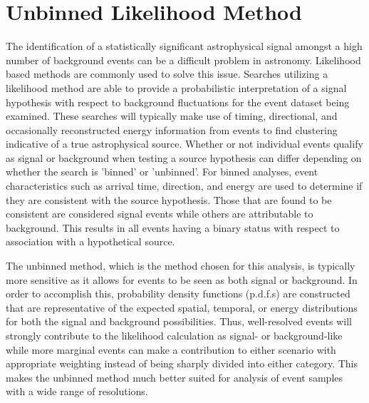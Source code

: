 \documentclass{gatech-thesis}
\begin{document}
\section{Unbinned Likelihood Method}
The identification of a statistically significant astrophysical signal amongst a high number of background events can be a difficult problem in astronomy. Likelihood based methods are commonly used to solve this issue. Searches utilizing a likelihood method are able to provide a probabilistic interpretation of a signal hypothesis with respect to background fluctuations for the event dataset being examined. These searches will typically make use of timing, directional, and occasionally reconstructed energy information from events to find clustering indicative of a true astrophysical source. Whether or not individual events qualify as signal or background when testing a source hypothesis can differ depending on whether the search is 'binned' or 'unbinned'. For binned analyses, event characteristics such as arrival time, direction, and energy are used to determine if they are consistent with the source hypothesis. Those that are found to be consistent are considered signal events while others are attributable to background. This results in all events having a binary status with respect to association with a hypothetical source. 

The unbinned method, which is the method chosen for this analysis, is typically more sensitive as it allows for events to be seen as both signal or background. In order to accomplish this, probability density functions (p.d.f.s) are constructed that are representative of the expected spatial, temporal, or energy distributions for both the signal and background possibilities. Thus, well-resolved events will strongly contribute to the likelihood calculation as signal- or background-like while more marginal events can make a contribution to either scenario with appropriate weighting instead of being sharply divided into either category. This makes the unbinned method much better suited for analysis of event samples with a wide range of resolutions.
\end{document}
